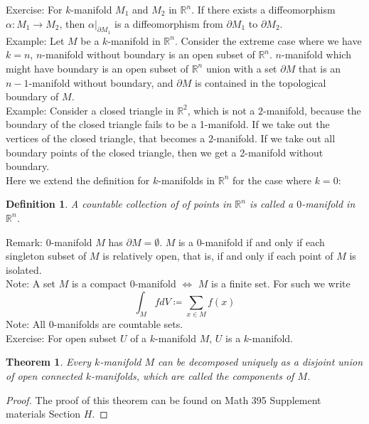 \documentclass[11pt,oneside]{book}
\theoremstyle{break}
\theoremstyle{break}
\newtheorem{thm}{Theorem}[section]
\newtheorem{defn}{Definition}[corL]
\newcommand{\R}{\mathbb{R}}
\newcommand{\note}{\color{red}Note: \color{black}}
\newcommand{\remark}{\color{blue}Remark: \color{black}}
\newcommand{\example}{\color{green}Example: \color{black}}
\newcommand{\exercise}{\color{green}Exercise: \color{black}}
\begin{document}
\exercise For $k$-manifold $M_1$ and $M_2$ in $\R^n$. If there exists a diffeomorphism $\alpha:M_1 \to M_2$, then $\alpha|_{\partial M_1}$ is a diffeomorphism from $\partial M_1$ to $\partial M_2$.\\

\example Let $M$ be a $k$-manifold in $\R^n$. Consider the extreme case where we have $k=n$, $n$-manifold without boundary is an open subset of $\R^n$. $n$-manifold which might have boundary is an open subset of $\R^n$ union with a set $\partial M$ that is an $n-1$-manifold without boundary, and $\partial M$ is contained in the topological boundary of $M$. \\

\example
Consider a closed triangle in $\R^2$, which is not a $2$-manifold, because the boundary of the closed triangle fails to be a 1-manifold. If we take out the vertices of the closed triangle, that becomes a $2$-manifold. If we take out all boundary points of the closed triangle, then we get a 2-manifold without boundary.\\
\newpage
Here we extend the definition for $k$-manifolds in $\R^n$ for the case where $k=0$: \begin{defn} 
A countable collection of of points in $\R^n$ is called a $0$-manifold in $\R^n$.
\end{defn}

\remark $0$-manifold $M$ has $\partial M = \emptyset$. $M$ is a $0$-manifold if and only if each singleton subset of $M$ is relatively open, that is, if and only if each point of $M$ is isolated. \\

\note A set $M$ is a compact $0$-manifold $\iff$ $M$ is a finite set. For such we write $$\int_M fdV \coloneqq \sum_{x \in M} f(x)$$
\note All $0$-manifolds are countable sets. \\

\exercise For open subset $U$ of a $k$-manifold $M$, $U$ is a $k$-manifold.\\

\begin{thm}
Every $k$-manifold $M$ can be decomposed uniquely as a disjoint union of open connected $k$-manifolds, which are called the components of $M$. 
\end{thm}
\begin{proof}
The proof of this theorem can be found on Math 395 Supplement materials Section $H$.
\end{proof}
\end{document}
